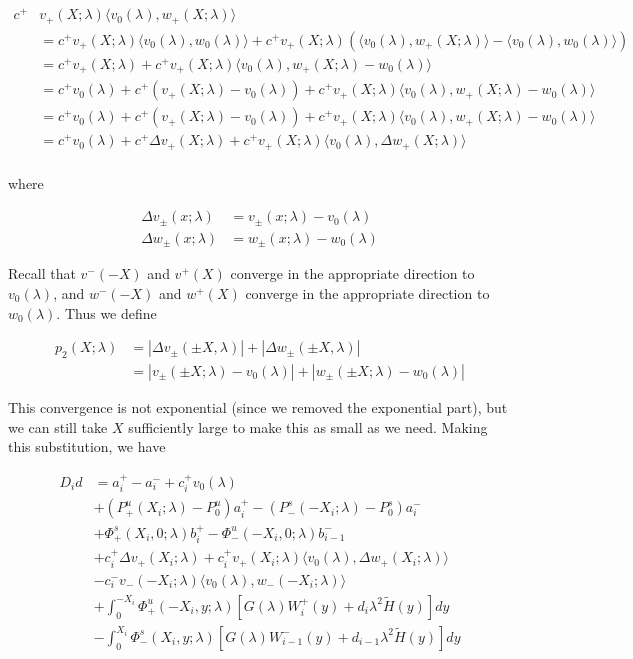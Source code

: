 \documentclass[12pt]{article}
\begin{document}
\begin{enumerate}
\begin{align*}
c^+ &v_+(X; \lambda)\langle v_0(\lambda), w_+(X; \lambda) \rangle \\
&= c^+ v_+(X; \lambda)\langle v_0(\lambda), w_0(\lambda) \rangle + c^+ v_+(X; \lambda)( \langle v_0(\lambda), w_+(X; \lambda) \rangle - \langle v_0(\lambda), w_0(\lambda) \rangle )\\
&= c^+ v_+(X; \lambda) + c^+ v_+(X; \lambda) \langle v_0(\lambda), w_+(X; \lambda) - w_0(\lambda) \rangle \\
&= c^+ v_0(\lambda) + c^+( v_+(X; \lambda) - v_0(\lambda)) + c^+ v_+(X; \lambda) \langle v_0(\lambda), w_+(X; \lambda) - w_0(\lambda) \rangle \\
&= c^+ v_0(\lambda) + c^+( v_+(X; \lambda) - v_0(\lambda)) + c^+ v_+(X; \lambda) \langle v_0(\lambda), w_+(X; \lambda) - w_0(\lambda) \rangle \\
&= c^+ v_0(\lambda) + c^+ \Delta v_+(X; \lambda) + c^+ v_+(X; \lambda) \langle v_0(\lambda), \Delta w_+(X; \lambda) \rangle \\
\end{align*}

where

\begin{align*}
\Delta v_\pm(x; \lambda) &= v_\pm(x; \lambda) - v_0(\lambda) \\
\Delta w_\pm(x; \lambda) &= w_\pm(x; \lambda) - w_0(\lambda)
\end{align*}

Recall that $v^-(-X)$ and $v^+(X)$ converge in the appropriate direction to $v_0(\lambda)$, and $w^-(-X)$ and $w^+(X)$ converge in the appropriate direction to $w_0(\lambda)$. Thus we define

\begin{align*}
p_2(X; \lambda) &= |\Delta v_\pm(\pm X, \lambda)| + |\Delta w_\pm(\pm X, \lambda)|\\
&= |v_\pm(\pm X; \lambda) - v_0(\lambda)| + |w_\pm(\pm X; \lambda) - w_0(\lambda)|
\end{align*}

This convergence is not exponential (since we removed the exponential part), but we can still take $X$ sufficiently large to make this as small as we need. Making this substitution, we have

\begin{align*}
D_i d &= a_i^+ - a_i^- + c_i^+ v_0(\lambda) \\
&+ (P^u_+(X_i; \lambda) - P_0^u)a_i^+ - (P^s_-(-X_i; \lambda) - P_0^s)a_i^- \\
&+ \Phi^s_+(X_i, 0; \lambda)b_i^+ - \Phi^u_-(-X_i, 0; \lambda)b_{i-1}^- \\
&+ c_i^+ \Delta v_+(X_i; \lambda) + c_i^+ v_+(X_i; \lambda) \langle v_0(\lambda), \Delta w_+(X_i; \lambda) \rangle \\
&- c_i^- v_-(-X_i; \lambda) \langle v_0(\lambda), w_-(-X_i; \lambda) \rangle \\
&+ \int_0^{-X_i} \Phi^u_+(-X_i, y; \lambda) [ G(\lambda)W_i^+(y) + d_i \lambda^2 \tilde{H}(y) ] dy \\
&- \int_0^{X_i} \Phi^s_-(X_i, y; \lambda) [ G(\lambda)W_{i-1}^-(y) + d_{i-1} \lambda^2 \tilde{H}(y) ] dy
\end{align*}


\end{enumerate}
\end{document}
